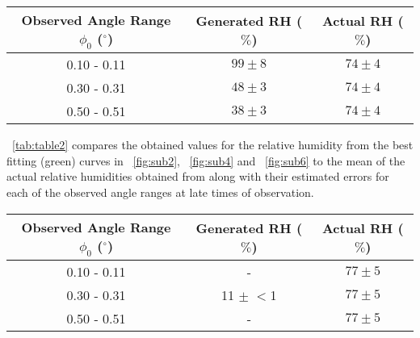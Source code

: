 \documentclass{article}
\newcommand{\figref}[2][\figurename~]{#1\ref{#2}}
\newcommand{\tabref}[2][\tablename~]{#1\ref{#2}}
\begin{document}
\vspace{5mm}
\begin{table*}[h]
\centering %
\caption{A table comparing generated relative humidities (RH) from an interpolative and least squares method for the various different observed angle, $\phi_0$ ranges investigated to the mean of the actual RH values given by \cite{Web01} for the early times of observation (first 5000s).}
\label{tab:table1}
\begin{tabular}{|c|c|c|}
\hline
Observed Angle Range $\phi_0$ ($^{\circ}$) & Generated RH ($\%$) & Actual RH ($\%$) \cite{Web01} \\
\hline
0.10 - 0.11 & $99 \pm 8$ & $74 \pm 4$ \\
\hline
0.30 - 0.31 & $48 \pm 3$ & $74 \pm 4$ \\
\hline
0.50 - 0.51 & $38 \pm 3$ & $74 \pm 4$ \\
\hline
\end{tabular}
\end{table*}

\vspace{2mm}
\noindent
\tabref{tab:table2} compares the obtained values for the relative humidity from the best fitting (green) curves in \figref{fig:sub2}, \figref{fig:sub4} and \figref{fig:sub6} to the mean of the actual relative humidities obtained from \cite{Web01} along with their estimated errors for each of the observed angle ranges at late times of observation.

\vspace{5mm}
\begin{table*}[h]
\centering %
\caption{A table comparing generated relative humidities (RH) from an interpolative and least squares method for the various different observed angle, $\phi_0$ ranges investigated to the mean of the actual RH values given by \cite{Web01} for the late times of observation (last 5000s).}
\label{tab:table2}
\begin{tabular}{|c|c|c|}
\hline
Observed Angle Range $\phi_0$ ($^{\circ}$) & Generated RH ($\%$) & Actual RH ($\%$) \cite{Web01} \\
\hline
0.10 - 0.11 & - & $77 \pm 5$ \\
\hline
0.30 - 0.31 & 11 $\pm$ $<$1 & $77 \pm 5$ \\
\hline
0.50 - 0.51 & - & $77 \pm 5$ \\
\hline
\end{tabular}
\end{table*}
\end{document}
